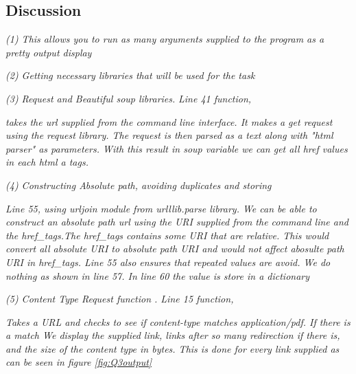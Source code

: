 \documentclass[12pt]{article}
\begin{document}
\subsection*{Discussion}
\emph{(1) This allows you to run as many arguments supplied to the program as a pretty output display}

\emph{(2) Getting necessary libraries that will be used for the task}

\emph{(3) Request and Beautiful soup libraries. }
\emph{ Line 41 function,}




\emph{takes the url supplied from the command line interface. It makes a get request using the request library. The request is then parsed as a text along with "html parser" as parameters. With this result in soup variable we can get all  href values in each html a tags.}

\emph{(4) Constructing Absolute path, avoiding duplicates and storing}

\emph{Line 55, using urljoin module from urlllib.parse library. We can be able to construct an absolute path url using the URI supplied from the command line and the href\_tags.The href\_tags contains some URI that are relative. This would convert all absolute URI to absolute path URI and would not affect abosulte path URI in href\_tags. Line 55 also ensures that repeated values are avoid. We do nothing as shown in line 57. In line 60 the value is store in a dictionary }

\emph{(5) Content Type Request function . Line 15 function,}



\emph{Takes a URL and checks to see if content-type matches application/pdf. If there is a match We display the supplied link, links after so many redirection if there is, and the size of the content type in bytes. This is done for every link supplied as can be seen in figure \ref{fig:Q3output}}
\end{document}
